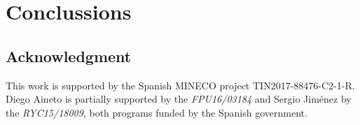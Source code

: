 \documentclass[3p,times]{elsarticle}
\begin{document}
\section{Conclussions}
\label{sec:Section9}



\begin{small}
\subsection*{Acknowledgment}
This work is supported by the Spanish MINECO project TIN2017-88476-C2-1-R. Diego Aineto is partially supported by the {\it FPU16/03184} and Sergio Jim\'enez by the {\it RYC15/18009}, both programs funded by the Spanish government.
\end{small}












\end{document}
